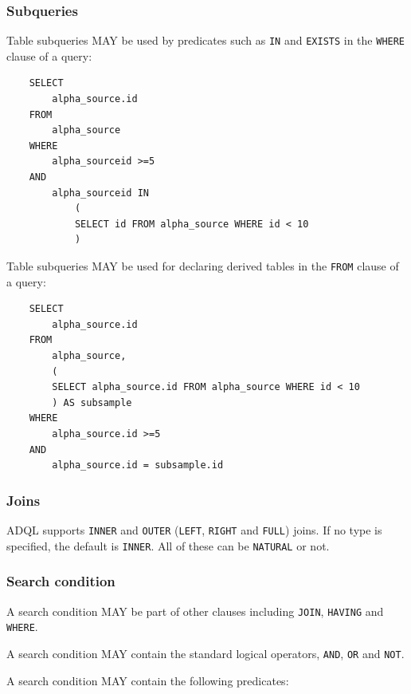\documentclass[11pt,a4paper]{ivoa}
\begin{document}
\subsubsection{Subqueries}
\label{sec:subqueries}

Table subqueries MAY be used by predicates such as \verb:IN: and \verb:EXISTS:
in the \verb:WHERE: clause of a query:

\begin{verbatim}
    SELECT
        alpha_source.id
    FROM 
        alpha_source
    WHERE
        alpha_sourceid >=5
    AND
        alpha_sourceid IN 
            (
            SELECT id FROM alpha_source WHERE id < 10
            )
\end{verbatim}

Table subqueries MAY be used for declaring derived tables in the \verb:FROM: clause
of a query:

\begin{verbatim}
    SELECT
        alpha_source.id
    FROM
        alpha_source,
        (
        SELECT alpha_source.id FROM alpha_source WHERE id < 10
        ) AS subsample
    WHERE
        alpha_source.id >=5
    AND
        alpha_source.id = subsample.id
\end{verbatim}

\subsubsection{Joins}
\label{sec:joins}

ADQL supports \verb:INNER: and \verb:OUTER:
(\verb:LEFT:, \verb:RIGHT: and \verb:FULL:) joins. If no type is specified, the
default is \verb:INNER:. All of these can be \verb:NATURAL: or not.


\subsubsection{Search condition}
\label{sec:search}

A search condition MAY be part of other clauses including \verb:JOIN:, \verb:HAVING: and \verb:WHERE:.

A search condition MAY contain the standard logical operators, \verb:AND:, \verb:OR: and \verb:NOT:.

A search condition MAY contain the following predicates:
\end{document}
